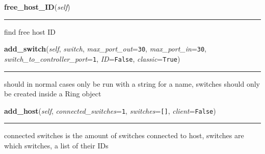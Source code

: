     \label{Data_Plane_DHT:Ring:free_host_ID}

    \vspace{0.5ex}

\hspace{.8\funcindent}\begin{boxedminipage}{\funcwidth}

    \raggedright \textbf{free\_host\_ID}(\textit{self})

    \vspace{-1.5ex}

    \rule{\textwidth}{0.5\fboxrule}
\setlength{\parskip}{2ex}
    find free host ID

\setlength{\parskip}{1ex}
    \end{boxedminipage}

    \label{Data_Plane_DHT:Ring:add_switch}

    \vspace{0.5ex}

\hspace{.8\funcindent}\begin{boxedminipage}{\funcwidth}

    \raggedright \textbf{add\_switch}(\textit{self}, \textit{switch}, \textit{max\_port\_out}={\tt 30}, \textit{max\_port\_in}={\tt 30}, \textit{switch\_to\_controller\_port}={\tt 1}, \textit{ID}={\tt False}, \textit{classic}={\tt True})

    \vspace{-1.5ex}

    \rule{\textwidth}{0.5\fboxrule}
\setlength{\parskip}{2ex}
    should in normal cases only be run with a string for a name, switches 
    should only be created inside a Ring object

\setlength{\parskip}{1ex}
    \end{boxedminipage}

    \label{Data_Plane_DHT:Ring:add_host}

    \vspace{0.5ex}

\hspace{.8\funcindent}\begin{boxedminipage}{\funcwidth}

    \raggedright \textbf{add\_host}(\textit{self}, \textit{connected\_switches}={\tt 1}, \textit{switches}={\tt \texttt{[}\texttt{]}}, \textit{client}={\tt False})

    \vspace{-1.5ex}

    \rule{\textwidth}{0.5\fboxrule}
\setlength{\parskip}{2ex}
    connected switches is the amount of switches connected to host, 
    switches are which switches, a list of their IDs

\setlength{\parskip}{1ex}
    \end{boxedminipage}

